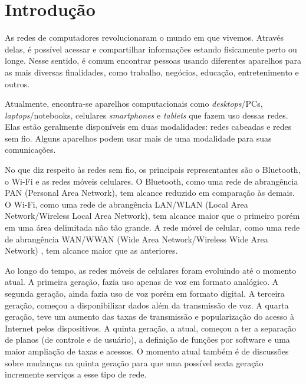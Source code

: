 \documentclass[11pt,oneside,a4paper]{abntex2}
\begin{document}


\maketitle

\section*{Introdução}
\label{intro}

As redes de computadores revolucionaram o mundo em que vivemos. Através delas, é possível acessar e compartilhar informações estando fisicamente perto ou longe. Nesse sentido, é comum encontrar pessoas usando diferentes aparelhos para as mais diversas finalidades, como trabalho, negócios, educação, entretenimento e outros.

Atualmente, encontra-se aparelhos computacionais como \textit{desktops}/PCs, \textit{laptops}/notebooks, celulares \textit{smartphones} e \textit{tablets} que fazem uso dessas redes. Elas estão geralmente disponíveis em duas modalidades: redes cabeadas e redes sem fio. Alguns aparelhos podem usar mais de uma modalidade para suas comunicações.

No que diz respeito às redes sem fio, os principais representantes são o Bluetooth, o Wi-Fi e as redes móveis celulares. O Bluetooth, como uma rede de abrangência PAN (Personal Area Network), tem alcance reduzido em comparação às demais. O Wi-Fi, como uma rede de abrangência LAN/WLAN (Local Area Network/Wireless Local Area Network), tem alcance maior que o primeiro porém em uma área delimitada não tão grande. A rede móvel de celular, como uma rede de abrangência WAN/WWAN (Wide Area Network/Wireless Wide Area Network) \cite{wwan}, tem alcance maior que as anteriores.

Ao longo do tempo, as redes móveis de celulares foram evoluindo até o momento atual. A primeira geração, fazia uso apenas de voz em formato analógico. A segunda geração, ainda fazia uso de voz porém em formato digital. A terceira geração, começou a disponibilizar dados além da transmissão de voz. A quarta geração, teve um aumento das taxas de transmissão e popularização do acesso à Internet pelos dispositivos. A quinta geração, a atual, começou a ter a separação de planos (de controle e de usuário), a definição de funções por software e uma maior ampliação de taxas e acessos. O momento atual também é de discussões sobre mudanças na quinta geração para que uma possível sexta geração incremente serviços a esse tipo de rede.
\end{document}
